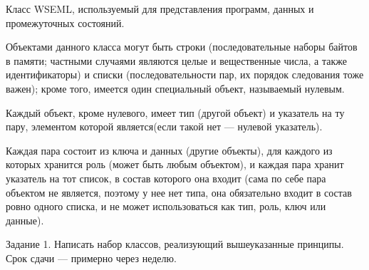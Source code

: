 \documentclass{report}
\begin{document}
    Класс WSEML, используемый для представления программ, данных и промежуточных состояний.

    Объектами данного класса могут быть строки (последовательные наборы байтов в памяти; частными случаями являются целые и вещественные числа, а также идентификаторы) и списки (последовательности пар, их порядок следования тоже важен); кроме того, имеется один специальный объект, называемый нулевым.

    Каждый объект, кроме нулевого, имеет тип (другой объект) и указатель на ту пару, элементом которой является(если такой нет --- нулевой указатель).

    Каждая пара состоит из ключа и данных (другие объекты), для каждого из которых хранится роль (может быть любым объектом), и каждая пара хранит указатель на тот список, в состав которого она входит (сама по себе пара объектом не является, поэтому у нее нет типа, она обязательно входит в состав ровно одного списка, и не может использоваться как тип, роль, ключ или данные).

    Задание 1. Написать набор классов, реализующий вышеуказанные принципы. Срок сдачи --- примерно через неделю.
\end{document}
